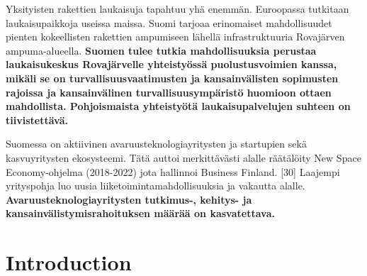 \documentclass[nobib,finnish,oneside,openany,notoc,a4paper]{tufte-book}
\begin{document}
Yksityisten rakettien laukaisuja tapahtuu yhä enemmän. Euroopassa
tutkitaan laukaisupaikkoja useissa maissa. Suomi tarjoaa erinomaiset
mahdollisuudet pienten kokeellisten rakettien ampumiseen lähellä
infrastruktuuria Rovajärven ampuma-alueella. \textbf{Suomen tulee tutkia
mahdollisuuksia perustaa laukaisukeskus Rovajärvelle yhteistyössä
puolustusvoimien kanssa, mikäli se on turvallisuusvaatimusten ja
kansainvälisten sopimusten rajoissa ja kansainvälinen
turvallisuusympäristö huomioon ottaen mahdollista. Pohjoismaista
yhteistyötä laukaisupalvelujen suhteen on tiivistettävä.}

Suomessa on aktiivinen avaruusteknologiayritysten ja startupien sekä
kasvuyritysten ekosysteemi. Tätä auttoi merkittävästi alalle räätälöity
New Space Economy-ohjelma (2018-2022) jota hallinnoi Business Finland.
{[}30{]} Laajempi yrityspohja luo uusia liiketoimintamahdollisuuksia ja
vakautta alalle. \textbf{Avaruusteknologiayritysten tutkimus-, kehitys-
ja kansainvälistymisrahoituksen määrää on kasvatettava.}

\chapter{Introduction}
\end{document}
